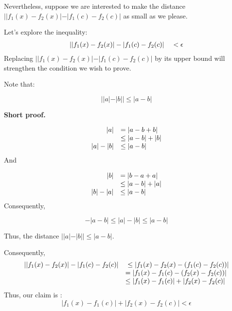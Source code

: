 \documentclass[10pt]{article}
\begin{document}
Nevertheless, suppose we are interested to make the distance $\displaystyle ||f_{1}( x) -f_{2}( x) |-|f_{1}( c) -f_{2}( c) |$ as small as we please.



Let's explore the inequality:
\begin{equation*}
\begin{array}{ r l }
||f_{1}( x) -f_{2}( x) |-|f_{1}( c) -f_{2}( c) |\  & < \epsilon 
\end{array}
\end{equation*}
Replacing $\displaystyle ||f_{1}( x) -f_{2}( x) |-|f_{1}( c) -f_{2}( c) |$ by its upper bound will strengthen the condition we wish to prove.



Note that:


\begin{equation*}
||a|-|b||\leq |a-b|
\end{equation*}


\textbf{Short proof.}


\begin{equation*}
\begin{array}{ r l }
|a| & =|a-b+b|\\
 & \leq |a-b|+|b|\\
|a|-|b| & \leq |a-b|
\end{array}
\end{equation*}
And


\begin{equation*}
\begin{array}{ r l }
|b| & =|b-a+a|\\
 & \leq |a-b|+|a|\\
|b|-|a| & \leq |a-b|
\end{array}
\end{equation*}
Consequently,


\begin{equation*}
-|a-b|\leq |a|-|b|\leq |a-b|
\end{equation*}


Thus, the distance $\displaystyle ||a|-|b||\leq |a-b|$.



Consequently, 
\begin{equation*}
\begin{array}{ c l }
||f_{1}( x) -f_{2}( x) |-|f_{1}( c) -f_{2}( c) | & \ \leq |f_{1}( x) -f_{2}( x) -( f_{1}( c) -f_{2}( c)) |\\
 & =|f_{1}( x) -f_{1}( c) -( f_{2}( x) -f_{2}( c)) |\\
 & \leq |f_{1}( x) -f_{1}( c) |+|f_{2}( x) -f_{2}( c) |
\end{array}
\end{equation*}
Thus, our claim is :
\begin{equation*}
|f_{1}( x) -f_{1}( c) |+|f_{2}( x) -f_{2}( c) |< \epsilon 
\end{equation*}
\end{document}
